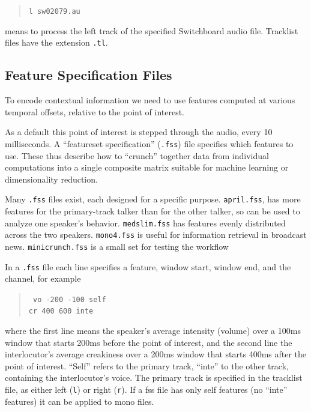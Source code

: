 \documentclass[11pt]{article}
\begin{document}
\begin{quote}
\verb+l sw02079.au+
\end{quote}

means to process the left track of the specified Switchboard audio
file.  Tracklist files have the extension {\tt .tl}. 


\subsection{Feature Specification Files}     \label{featurespec-files}

To encode contextual information we need to use features computed at
various temporal offsets, relative to the point of interest.

As a default this point of interest is stepped through the audio,
every 10 milliseconds.  A ``featureset specification'' ({\tt .fss})
file specifies which features to use.  These thus describe how to
``crunch'' together data from individual computations into a single
composite matrix suitable for machine learning or dimensionality
reduction.

Many {\tt .fss} files exist, each designed for a specific purpose.
{\tt april.fss}, has more features for the primary-track talker than
for the other talker, so can be used to analyze one speaker's
behavior.  {\tt medslim.fss} has features evenly distributed across
the two speakers.  {\tt mono4.fss} is useful for information retrieval
in broadcast news.  {\tt minicrunch.fss} is a small set for testing
the workflow

In a {\tt .fss} file each line specifies a feature, window start,
window end, and the channel, for example

\begin{quote}{\tt 
    vo   -200   -100 self  \\
    cr    400    600 inte
}\end{quote}

where the first line means the speaker's average intensity (volume)
over a 100ms window that starts 200ms before the point of interest,
and the second line the interlocutor's average creakiness over a 200ms
window that starts 400ms after the point of interest.  ``Self'' refers
to the primary track, ``inte'' to the other track, containing the
interlocutor's voice.  The primary track is specified in the tracklist
file, as either left ({\tt l}) or right ({\tt r}).  If a fss file has only self
features (no ``inte'' features) it can be applied to mono files.
\end{document}
